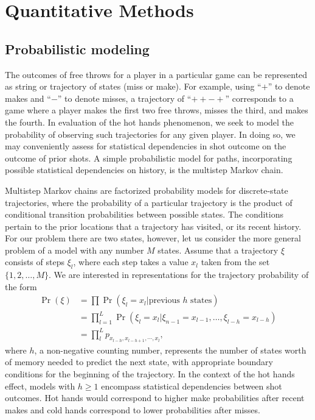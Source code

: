 \documentclass{IOS-Book-Article}
\begin{document}
\section{Quantitative Methods}

\subsection{Probabilistic modeling}

The outcomes of free throws for a player in a particular game can be  represented as string or trajectory of
states (miss or make). For example, using ``$+$'' to denote makes and ``$-$'' to denote misses, a trajectory of ``$++-+$'' corresponds
to a game where a player makes the first two free throws, misses the third, and makes the fourth.
In evaluation of the hot hands phenomenon, we seek to model the probability of observing such trajectories
for any given player. In doing so, we may conveniently assess for statistical dependencies in shot outcome
on the outcome of prior shots. A simple probabilistic model for paths, incorporating possible statistical dependencies
on history, is the multistep Markov chain.

Multistep Markov chains are factorized probability models for discrete-state trajectories, where the probability of
a particular trajectory is the product of conditional transition probabilities between possible states.
The conditions pertain to the prior locations that a trajectory has visited, or its recent history.
  For our problem there are
two states, however, let us consider the more general problem of a model with any number $M$ states.
Assume that a trajectory $\xi$ consists of steps $\xi_l$, where each step takes  a value $x_l$ taken from the set $\{1,2,\ldots,M\}.$ We are interested in representations for the trajectory probability of the  form
\begin{align}
\Pr(\xi) &=\prod \Pr\left( \xi_l = x_l  | \textrm{previous $h$ states} \right) \nonumber\\
&=\prod_{l=1}^L \Pr(\xi_l = x_l | \xi_{n-1} = x_{l-1}, \ldots, \xi_{l-h} = x_{l-h} )  \nonumber\\
&= \prod_{l}^L p_{x_{l-h},x_{l-h+1},\cdots,x_l}, 
\label{eq:factorize}
\end{align}
%
%
where $h$, a non-negative counting number, represents the number of states worth of memory needed to predict the next state, with appropriate boundary conditions for the beginning of the trajectory. In the context of the hot hands effect, models with $h\geq1$ encompass statistical dependencies between shot outcomes. Hot hands would correspond to higher
make probabilities after recent makes and cold hands correspond to lower probabilities after misses.
\end{document}
